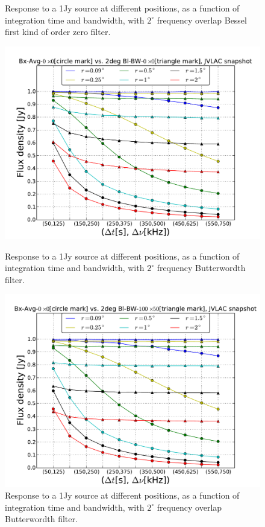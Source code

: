 \documentclass[useAMS,usenatbib]{mn2e}
\begin{document}
\begin{figure}
\begin{minipage}{0.38\linewidth}
      \caption{Response to a 1Jy source at different positions, as a function of integration time and bandwidth, with $2^{\circ}$ frequency 
overlap Bessel first kind of order zero filter.}
  \label{fig:max-integ-timefreq-bessel-w100x50-fov2}\end{minipage}
\begin{minipage}{0.38\linewidth}\includegraphics[width=1\textwidth]{./Figures/max-integ-timefreq-butter-w1x1-fov2.pdf}
      \caption{Response to a 1Jy source at different positions, as a function of integration time and bandwidth, with $2^{\circ}$ frequency 
Butterwordth filter.}
      \label{fig:max-integ-timefreq-butter-w1x1-fov2}\end{minipage}
\hspace{1cm}
\begin{minipage}{0.38\linewidth}\includegraphics[width=1\textwidth]{./Figures/max-integ-timefreq-butter-w100x50-fov2.pdf}
      \caption{Response to a 1Jy source at different positions, as a function of integration time and bandwidth, with $2^{\circ}$ frequency 
overlap Butterwordth filter.}
  \label{fig:max-integ-timefreq-butter-w100x50-fov2}\end{minipage}
\end{figure}
\end{document}
